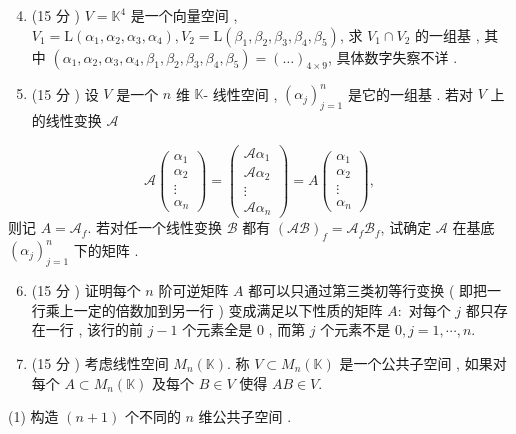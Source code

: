 \documentclass[10pt]{article}
\begin{document}
\begin{enumerate}
  \setcounter{enumi}{3}
  \item (15  分 ) $V=\mathbb{K}^{4}$  是一个向量空间 , $V_{1}=\mathrm{L}\left(\alpha_{1}, \alpha_{2}, \alpha_{3}, \alpha_{4}\right), V_{2}=\mathrm{L}\left(\beta_{1}, \beta_{2}, \beta_{3}, \beta_{4}, \beta_{5}\right)$,  求  $V_{1} \cap V_{2}$  的一组基 ,  其   中  $\left(\alpha_{1}, \alpha_{2}, \alpha_{3}, \alpha_{4}, \beta_{1}, \beta_{2}, \beta_{3}, \beta_{4}, \beta_{5}\right)=(\ldots)_{4 \times 9}$,  具体数字失察不详 .

  \item (15  分 )  设  $V$  是一个  $n$  维  $\mathbb{K}$- 线性空间 , $\left(\alpha_{j}\right)_{j=1}^{n}$  是它的一组基 .  若对  $V$  上的线性变换  $\mathscr{A}$

\end{enumerate}
$$
\mathscr{A}\left(\begin{array}{c}
\alpha_{1} \\
\alpha_{2} \\
\vdots \\
\alpha_{n}
\end{array}\right)=\left(\begin{array}{c}
\mathscr{A} \alpha_{1} \\
\mathscr{A} \alpha_{2} \\
\vdots \\
\mathscr{A} \alpha_{n}
\end{array}\right)=A\left(\begin{array}{c}
\alpha_{1} \\
\alpha_{2} \\
\vdots \\
\alpha_{n}
\end{array}\right),
$$
 则记  $A=\mathscr{A}_{f}$.  若对任一个线性变换  $\mathscr{B}$  都有  $(\mathscr{A} \mathscr{B})_{f}=\mathscr{A}_{f} \mathscr{B}_{f}$,  试确定  $\mathscr{A}$  在基底  $\left(\alpha_{j}\right)_{j=1}^{n}$  下的矩阵 .

\begin{enumerate}
  \setcounter{enumi}{5}
  \item (15  分 )  证明每个  $n$  阶可逆矩阵  $A$  都可以只通过第三类初等行变换  ( 即把一行乘上一定的倍数加到另一行 )  变成满足以下性质的矩阵  $A:$  对每个  $j$  都只存在一行 ,  该行的前  $j-1$  个元素全是  0 ,  而第  $j$  个元素不是  $0, j=1, \cdots, n$.

  \item (15  分 )  考虑线性空间  $M_{n}(\mathbb{K})$.  称  $V \subset M_{n}(\mathbb{K})$  是一个公共子空间 ,  如果对每个  $A \subset M_{n}(\mathbb{K})$  及每个  $B \in V$  使得  $A B \in V$.

\end{enumerate}
(1)  构造  $(n+1)$  个不同的  $n$  维公共子空间 .
\end{document}
